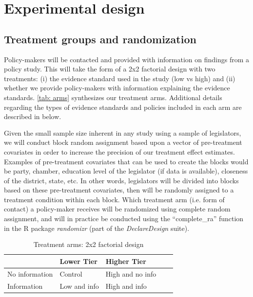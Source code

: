 \documentclass[12pt,final,fleqn]{article}
\theoremstyle{plain}
\begin{document}
\section{Experimental design} \label{sec:Design}

\subsection{Treatment groups and randomization} \label{sec:Treatment}

Policy-makers will be contacted and provided with information on findings from a policy study. This will take the form of a 2x2 factorial design with two treatments: (i) the evidence standard used in the study (low vs high) and (ii) whether we provide policy-makers with information explaining the evidence standards. \autoref{tab: arms} synthesizes our treatment arms. Additional details regarding the types of evidence standards and policies included in each arm are described in  below. 

Given the small sample size inherent in any study using a sample of legislators, we will conduct block random assignment based upon a vector of pre-treatment covariates in order to increase the precision of our treatment effect estimates. Examples of pre-treatment covariates that can be used to create the blocks would be party, chamber, education level of the legislator (if data is available), closeness of the district, state, etc. In other words, legislators will be divided into blocks based on these pre-treatment covariates, then will be randomly assigned to a treatment condition within each block. Which treatment arm (i.e. form of contact) a policy-maker receives will be randomized using complete random assignment, and will in practice be conducted using the ``complete\_ra'' function in the R package \textit{randomizr} (part of the \textit{DeclareDesign} suite).

\begin{table}[H]
\centering
\caption{Treatment arms: 2x2 factorial design}
\label{tab: arms} 
\bigbreak
\begin{tabular}{|l|l|l|l|l|}
\hline
&Lower Tier & Higher Tier           \\ \hline
No information & Control    &  High and no info           \\ \hline
Information    & Low and info       &  High and info              \\ \hline
\end{tabular}
\end{table}
\end{document}
